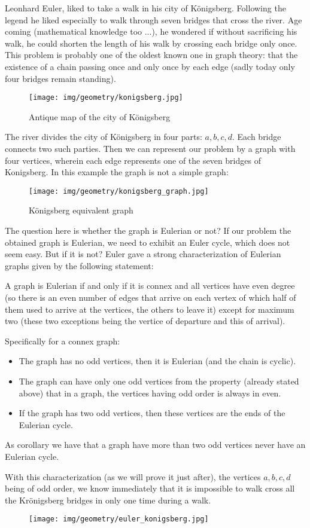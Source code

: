 {\begin{enumerate}
	Leonhard Euler, liked to take a walk in his city of Königsberg. Following the legend he liked especially to walk through seven bridges that cross the river. Age coming (mathematical knowledge too ...), he wondered if without sacrificing his walk, he could shorten the length of his walk by crossing each bridge only once. This problem is probably one of the oldest known one in graph theory: that the existence of a chain passing once and only once by each edge (sadly today only four bridges remain standing).
	\begin{figure}[H]
		\centering
		\texttt{[image: img/geometry/konigsberg.jpg]}
		\caption{Antique map of the city of Königsberg}
	\end{figure}
	The river divides the city of Königsberg in four parts: $a, b, c, d$. Each bridge connects two such parties. Then we can represent our problem by a graph with four vertices, wherein each edge represents one of the seven bridges of Konigsberg. In this example the graph is not a simple graph:
	\begin{figure}[H]
		\centering
		\texttt{[image: img/geometry/konigsberg\_graph.jpg]}
		\caption{Königsberg equivalent graph}
	\end{figure}
	The question here is whether the graph is Eulerian or not? If our problem the obtained graph is Eulerian, we need to exhibit an Euler cycle, which does not seem easy. But if it is not? Euler gave a strong characterization of Eulerian graphs given by the following statement:
	\begin{theorem}
	A graph is Eulerian if and only if it is connex and all vertices have even degree (so there is an even number of edges that arrive on each vertex of which half of them used to arrive at the vertices, the others to leave it) except for maximum two (these two exceptions being the vertice of departure and this of arrival).
	
	Specifically for a connex graph:
	\begin{itemize}
		\item The graph has no odd vertices, then it is Eulerian (and the chain is cyclic).
		
		\item The graph can have only one odd vertices from the property (already stated above) that in a graph, the vertices having odd order is always in even.
		
		\item If the graph has two odd vertices, then these vertices are the ends of the Eulerian cycle.
	\end{itemize}
	As corollary we have that a graph have more than two odd vertices never have an Eulerian cycle.
	\end{theorem}
	With this characterization (as we will prove it just after), the vertices $a,b,c,d$ being of odd order, we know immediately that it is impossible to walk cross all the Krönigsberg bridges in only one time during a walk.
	\begin{figure}[H]
		\centering
		\texttt{[image: img/geometry/euler\_konigsberg.jpg]}
	\end{figure}
	

\end{enumerate}}
